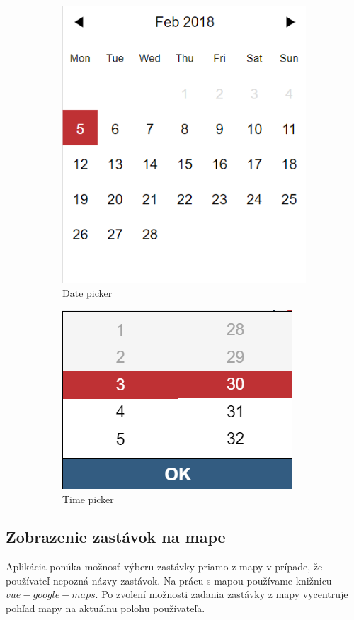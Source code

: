 \begin{figure}[H]
\centering
	\begin{subfigure}[b]{0.48\textwidth}
		\centering
 		\includegraphics[width=0.6\linewidth]{images/date-picker}
		\caption{Date picker}
		\label{fig:date-picker}
	\end{subfigure}
	\begin{subfigure}[b]{0.48\textwidth}
		\centering
		\includegraphics[width=0.6\linewidth]{images/time-picker}
			\caption{Time picker}
		\label{fig:time-picker}
	\end{subfigure}
	\caption[Date picker a Time picker]{}
\end{figure}


\subsection{Zobrazenie zastávok na mape}
Aplikácia ponúka možnosť výberu zastávky priamo z mapy v prípade, že používateľ nepozná názvy zastávok. Na prácu s mapou používame knižnicu $vue-google-maps$. Po zvolení možnosti zadania zastávky z mapy vycentruje pohľad mapy na aktuálnu polohu používateľa. 

